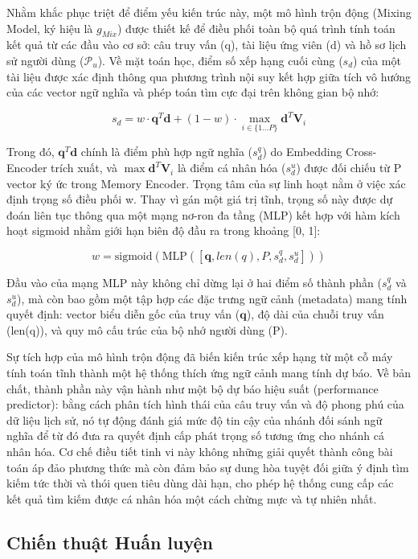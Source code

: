 Nhằm khắc phục triệt để điểm yếu kiến trúc này, một mô hình trộn động (Mixing Model, ký hiệu là $g_{Mix}$) được thiết kế để điều phối toàn bộ quá trình tính toán kết quả từ các đầu vào cơ sở: câu truy vấn (q), tài liệu ứng viên (d) và hồ sơ lịch sử người dùng ($\mathcal{P}_u$). Về mặt toán học, điểm số xếp hạng cuối cùng ($s_d$) của một tài liệu được xác định thông qua phương trình nội suy kết hợp giữa tích vô hướng của các vector ngữ nghĩa và phép toán tìm cực đại trên không gian bộ nhớ:

$$s_d = w \cdot \mathbf{q}^T \mathbf{d} + (1-w) \cdot \max_{i \in \{1...P\}} \mathbf{d}^T \mathbf{V}_i$$

Trong đó, $\mathbf{q}^T \mathbf{d}$ chính là điểm phù hợp ngữ nghĩa ($s_d^q$) do Embedding Cross-Encoder trích xuất, và $\max \mathbf{d}^T \mathbf{V}_i$ là điểm cá nhân hóa ($s_d^u$) được đối chiếu từ P vector ký ức trong Memory Encoder. Trọng tâm của sự linh hoạt nằm ở việc xác định trọng số điều phối w. Thay vì gán một giá trị tĩnh, trọng số này được dự đoán liên tục thông qua một mạng nơ-ron đa tầng (MLP) kết hợp với hàm kích hoạt sigmoid nhằm giới hạn biên độ đầu ra trong khoảng [0, 1]:

$$w = \text{sigmoid}(\text{MLP}([\mathbf{q}, len(q), P, s_d^q, s_d^u]))$$

Đầu vào của mạng MLP này không chỉ dừng lại ở hai điểm số thành phần ($s_d^q$ và $s_d^u$), mà còn bao gồm một tập hợp các đặc trưng ngữ cảnh (metadata) mang tính quyết định: vector biểu diễn gốc của truy vấn ($\mathbf{q}$), độ dài của chuỗi truy vấn (len(q)), và quy mô cấu trúc của bộ nhớ người dùng (P).

Sự tích hợp của mô hình trộn động đã biến kiến trúc xếp hạng từ một cỗ máy tính toán tĩnh thành một hệ thống thích ứng ngữ cảnh mang tính dự báo. Về bản chất, thành phần này vận hành như một bộ dự báo hiệu suất (performance predictor): bằng cách phân tích hình thái của câu truy vấn và độ phong phú của dữ liệu lịch sử, nó tự động đánh giá mức độ tin cậy của nhánh đối sánh ngữ nghĩa để từ đó đưa ra quyết định cấp phát trọng số tương ứng cho nhánh cá nhân hóa. Cơ chế điều tiết tinh vi này không những giải quyết thành công bài toán áp đảo phương thức mà còn đảm bảo sự dung hòa tuyệt đối giữa ý định tìm kiếm tức thời và thói quen tiêu dùng dài hạn, cho phép hệ thống cung cấp các kết quả tìm kiếm được cá nhân hóa một cách chừng mực và tự nhiên nhất.

\subsection{Chiến thuật Huấn luyện}

